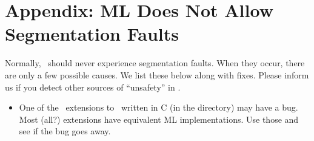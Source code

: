 %
%
%
\section{Appendix: ML Does Not Allow Segmentation Faults}

Normally, \ensemble\ should never experience segmentation faults.  When they occur,
there are only a few possible causes.  We list these below along with fixes.  Please
inform us if you detect other sources of ``unsafety'' in \ensemble.
\begin{itemize}
\item
One of the \ensemble\ extensions to \caml\ written in C (in the
 directory) may have a bug.  Most (all?) extensions have
equivalent ML implementations.  Use those and see if the bug goes away.
\end{itemize}

